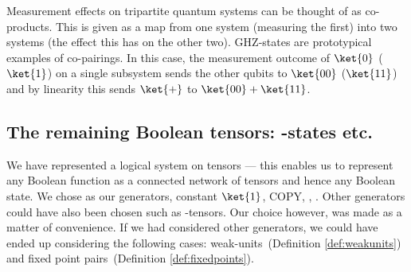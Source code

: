 \begin{example}
Measurement effects on tripartite quantum systems can be thought of as
co-products.  This is given as a map from one system (measuring the first) into two
systems (the effect this has on the other two). {\sf GHZ}-states are prototypical
examples of co-pairings.  In this case, the measurement outcome of $\ket{0}$
($\ket{1}$) on a single subsystem sends the other qubits to $\ket{00}$ ($\ket{11}$)
and by linearity this sends $\ket{+}$ to $\ket{00}+\ket{11}$.  
\end{example}

\subsection*{The remaining Boolean tensors: \NAND-states etc.}
We have represented a logical system on tensors --- this enables us
to represent any Boolean function as a connected network of tensors and hence any Boolean state.
We chose as our generators,
constant $\ket{1}$, {\sf COPY}, \XOR, \AND{}.  Other generators could have also been
chosen such as \NAND-tensors. Our choice however, was made as a matter of convenience. If we
had considered other generators, we could have ended up considering the
following cases: weak-units~(Definition \ref{def:weakunits}) and fixed point
pairs~(Definition \ref{def:fixedpoints}). 



